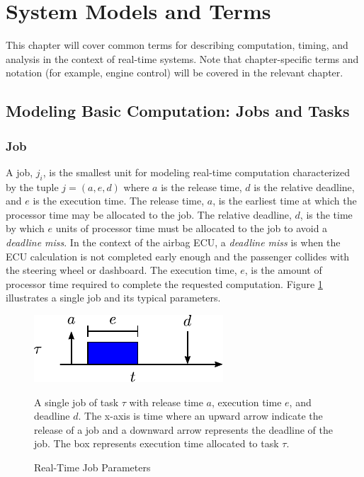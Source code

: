 \section{System Models and Terms}   \label{chap:systemModel}

This chapter will cover common terms for describing computation, timing, and analysis in the context of real-time systems.
Note that chapter-specific terms and notation (for example, engine control) will be covered in the relevant chapter.

\subsection{Modeling Basic Computation: Jobs and Tasks}


\subsubsection{Job}

A job, $j_i$, is the smallest unit for modeling real-time computation characterized by the tuple $j = (a,e,d)$ where $a$ is the release time, $d$ is the relative deadline, and $e$ is the execution time.
The release time, $a$, is the earliest time at which the processor time may be allocated to the job.
The relative deadline, $d$, is the time by which $e$ units of processor time must be allocated to the job to avoid a \textit{deadline miss}.
In the context of the airbag ECU, a \textit{deadline miss} is when the ECU calculation is not completed early enough and the passenger collides with the steering wheel or dashboard. 
The execution time, $e$, is the amount of processor time required to complete the requested computation. 
Figure \ref{fig:rt-job} illustrates a single job and its typical parameters.

\begin{figure}[!htbp]
    \centering
    \includegraphics[width=0.50\linewidth]{fig/singleJob.pdf}
    \caption{Real-Time Job Parameters} A single job of task $\tau$ with release time $a$, execution time $e$, and deadline $d$.
    The x-axis is time where an upward arrow indicate the release of a job and a downward arrow represents the deadline of the job.
    The box represents execution time allocated to task $\tau$.
    \label{fig:rt-job}
\end{figure}

